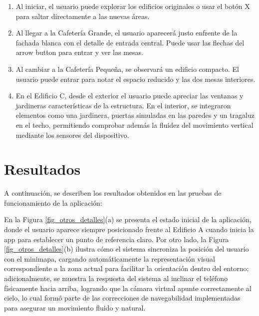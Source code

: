 \documentclass[conference]{IEEEtran}
\begin{document}
\begin{enumerate} 
	\item Al iniciar, el usuario puede explorar los edificios originales o usar el botón X para saltar directamente a las nuevas áreas.
	
	\vspace{0.2cm}
	
	\item Al llegar a la Cafetería Grande, el usuario aparecerá justo enfrente de la fachada blanca con el detalle de entrada central. Puede usar las flechas del arrow button para entrar y ver las mesas.
	
	\vspace{0.2cm}
	
	\item Al cambiar a la Cafetería Pequeña, se observará un edificio compacto. El usuario puede entrar para notar el espacio reducido y las dos mesas interiores.
	
	\vspace{0.2cm}
	
	\item En el Edificio C, desde el exterior el usuario puede apreciar las ventanas y jardineras características de la estructura. En el interior, se integraron elementos como una jardinera, puertas simuladas en las paredes y un tragaluz en el techo, permitiendo comprobar además la fluidez del movimiento vertical mediante los sensores del dispositivo.
	
\end{enumerate}

\vspace{0.3cm}

\section{Resultados}

A continuación, se describen los resultados obtenidos en las pruebas de funcionamiento de la aplicación:

\vspace{0.2cm}

En la Figura \ref{fig_otros_detalles}(a) se presenta el estado inicial de la aplicación, donde el usuario aparece siempre posicionado frente al Edificio A cuando inicia la app para establecer un punto de referencia claro. Por otro lado, la Figura \ref{fig_otros_detalles}(b) ilustra cómo el sistema sincroniza la posición del usuario con el minimapa, cargando automáticamente la representación visual correspondiente a la zona actual para facilitar la orientación dentro del entorno; adicionalmente, se muestra la respuesta del sistema al inclinar el teléfono físicamente hacia arriba, logrando que la cámara virtual apunte correctamente al cielo, lo cual formó parte de las correcciones de navegabilidad implementadas para asegurar un movimiento fluido y natural.
\end{document}
